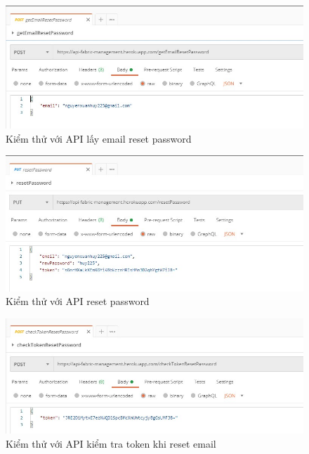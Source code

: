 \begin{figure}[H]
    \begin{center}
        \includegraphics[width=12cm]{Image/API/4_getMailReset.jpg}
        \caption{Kiểm thử với API lấy email reset password}
        \label{getMailReset}
    \end{center}
\end{figure}
\begin{figure}[H]
    \begin{center}
        \includegraphics[width=12cm]{Image/API/5_resetPass.jpg}
        \caption{Kiểm thử với API reset password}
        \label{resetPass}
    \end{center}
\end{figure}
\begin{figure}[H]
    \begin{center}
        \includegraphics[width=12cm]{Image/API/6_checkToken.jpg}
        \caption{Kiểm thử với API kiểm tra token khi reset email}
        \label{checkToken}
    \end{center}
\end{figure}


